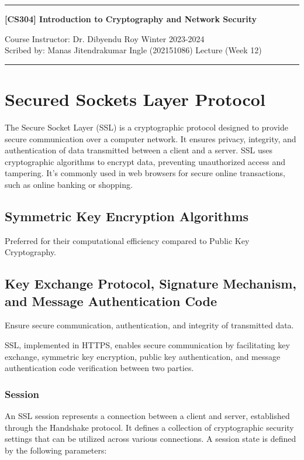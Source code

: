 \documentclass[11pt]{article}
\begin{document}
\noindent
\rule{\textwidth}{1pt}
\begin{center}
{\bf [CS304] Introduction to Cryptography and Network Security}
\end{center}
Course Instructor: Dr. Dibyendu Roy \hfill Winter 2023-2024\\
Scribed by: Manas Jitendrakumar Ingle (202151086) \hfill Lecture (Week 12)
\\
\rule{\textwidth}{1pt}

\section{Secured Sockets Layer Protocol}

The Secure Socket Layer (SSL) is a cryptographic protocol designed to provide secure communication over a computer network. It ensures privacy, integrity, and authentication of data transmitted between a client and a server. SSL uses cryptographic algorithms to encrypt data, preventing unauthorized access and tampering. It’s commonly used in web browsers for secure online transactions, such as online banking or shopping.

\subsection{Symmetric Key Encryption Algorithms}

Preferred for their computational efficiency compared to Public Key Cryptography.

\subsection{Key Exchange Protocol, Signature Mechanism, and Message Authentication Code}

Ensure secure communication, authentication, and integrity of transmitted data.

SSL, implemented in HTTPS, enables secure communication by facilitating key exchange, symmetric key encryption, public key authentication, and message authentication code verification between two parties.

\subsubsection{Session}

An SSL session represents a connection between a client and server, established through the Handshake protocol. It defines a collection of cryptographic security settings that can be utilized across various connections. A session state is defined by the following parameters:
\end{document}
